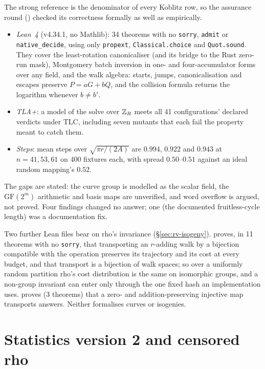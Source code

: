 The strong reference is the denominator of every Koblitz row, so the
assurance round () checked its
correctness formally as well as empirically.
\begin{itemize}
\item \emph{Lean~4} (v4.34.1, no Mathlib): 34 theorems with no
  \texttt{sorry}, \texttt{admit} or \texttt{native\_decide}, using only
  \texttt{propext}, \texttt{Classical.choice} and \texttt{Quot.sound}. They
  cover the least-rotation canonicaliser (and its bridge to the Rust
  zero-run mask), Montgomery batch inversion in one- and four-accumulator
  forms over any field, and the walk algebra: starts, jumps,
  canonicalisation and escapes preserve $P=aG+bQ$, and the collision
  formula returns the logarithm whenever $b\ne b'$.
\item \emph{TLA+}: a model of the solve over $\mathbb{Z}_R$ meets all 41
  configurations' declared verdicts under TLC, including seven mutants that
  each fail the property meant to catch them.
\item \emph{Steps}: mean steps over $\sqrt{\pi r/(2A)}$ are $0.994$,
  $0.922$ and $0.943$ at $n=41,53,61$ on 400 fixtures each, with spread
  $0.50$--$0.51$ against an ideal random mapping's $0.52$.
\end{itemize}
The gaps are stated: the curve group is modelled as the scalar field, the
$\mathrm{GF}(2^m)$ arithmetic and basis maps are unverified, and word
overflow is argued, not proved. Four findings changed no answer; one (the
documented fruitless-cycle length) was a documentation fix.

Two further Lean files bear on rho's invariance
(\S\ref{sec:rv-isogeny}). 
proves, in 11 theorems with no \texttt{sorry}, that transporting an
$r$-adding walk by a bijection compatible with the operation preserves its
trajectory and its cost at every budget, and that transport is a bijection
of walk spaces; so over a uniformly random partition rho's cost
distribution is the same on isomorphic groups, and a non-group invariant
can enter only through the one fixed hash an implementation uses.
 proves (3
theorems) that a zero- and addition-preserving injective map transports
answers. Neither formalises curves or isogenies.

\section{Statistics version 2 and censored rho}\label{sec:mr-stats}

